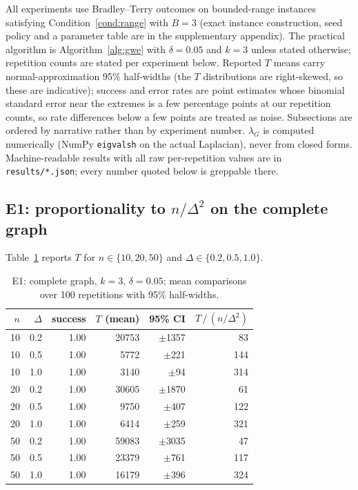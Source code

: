 \documentclass[11pt]{article}
\theoremstyle{definition}
\newcommand{\lG}{\lambda_G}
\begin{document}
All experiments use Bradley--Terry outcomes on bounded-range instances satisfying Condition~\ref{cond:range} with $B=3$ (exact instance construction, seed policy and a parameter table are in the supplementary appendix).  The practical algorithm is Algorithm~\ref{alg:gwe} with $\delta=0.05$ and $k=3$ unless stated otherwise; repetition counts are stated per experiment below.  Reported $T$ means carry normal-approximation 95\% half-widths (the $T$ distributions are right-skewed, so these are indicative); success and error rates are point estimates whose binomial standard error near the extremes is a few percentage points at our repetition counts, so rate differences below a few points are treated as noise.  Subsections are ordered by narrative rather than by experiment number.  $\lG$ is computed numerically (NumPy \texttt{eigvalsh} on the actual Laplacian), never from closed forms.  Machine-readable results with all raw per-repetition values are in \texttt{results/*.json}; every number quoted below is greppable there.

\subsection{E1: proportionality to $n/\Delta^2$ on the complete graph}

Table~\ref{tab:e1} reports $T$ for $n\in\{10,20,50\}$ and $\Delta\in\{0.2,0.5,1.0\}$.

\begin{table}[t]
\centering\small
\caption{E1: complete graph, $k=3$, $\delta=0.05$; mean comparisons over 100 repetitions with 95\% half-widths.}
\label{tab:e1}
\begin{tabular}{rrrrrr}
\toprule
$n$ & $\Delta$ & success & $T$ (mean) & 95\% CI & $T\,/\,(n/\Delta^2)$ \\
\midrule
10 & 0.2 & 1.00 & 20753 & $\pm$1357 & 83 \\
10 & 0.5 & 1.00 & 5772 & $\pm$221 & 144 \\
10 & 1.0 & 1.00 & 3140 & $\pm$94 & 314 \\
20 & 0.2 & 1.00 & 30605 & $\pm$1870 & 61 \\
20 & 0.5 & 1.00 & 9750 & $\pm$407 & 122 \\
20 & 1.0 & 1.00 & 6414 & $\pm$259 & 321 \\
50 & 0.2 & 1.00 & 59083 & $\pm$3035 & 47 \\
50 & 0.5 & 1.00 & 23379 & $\pm$761 & 117 \\
50 & 1.0 & 1.00 & 16179 & $\pm$396 & 324 \\
\bottomrule
\end{tabular}
\end{table}
\end{document}
